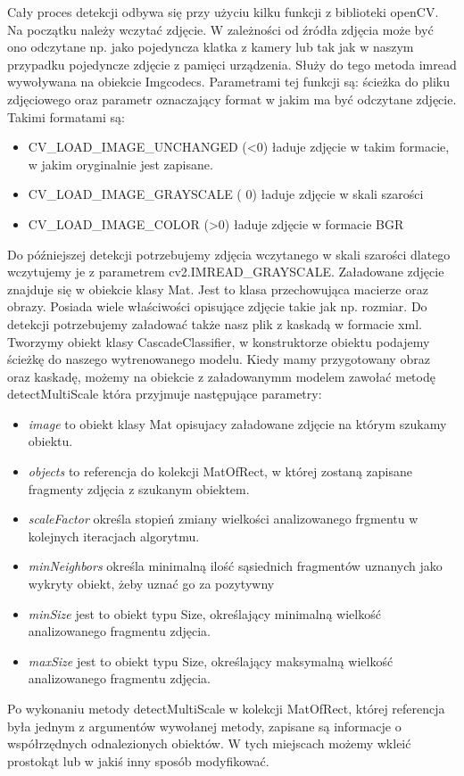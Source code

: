 Cały proces detekcji odbywa się przy użyciu kilku funkcji z biblioteki openCV. Na początku należy wczytać zdjęcie. W zależności od źródła zdjęcia może być ono odczytane np. jako pojedyncza klatka z kamery lub tak jak w naszym przypadku pojedyncze zdjęcie z pamięci urządzenia. Służy do tego metoda imread wywoływana na obiekcie Imgcodecs. Parametrami tej funkcji są: ścieżka do pliku zdjęciowego oraz parametr oznaczający format w jakim ma być odczytane zdjęcie. Takimi formatami są:
\begin{itemize}
    \item CV\_LOAD\_IMAGE\_UNCHANGED (\textless0) ładuje zdjęcie w takim formacie, w jakim oryginalnie jest zapisane.
    \item CV\_LOAD\_IMAGE\_GRAYSCALE ( 0) ładuje zdjęcie w skali szarości
    \item CV\_LOAD\_IMAGE\_COLOR (\textgreater0) ładuje zdjęcie w formacie BGR
\end{itemize}
Do późniejszej detekcji potrzebujemy zdjęcia wczytanego w skali szarości dlatego wczytujemy je z parametrem cv2.IMREAD\_GRAYSCALE.
Załadowane zdjęcie znajduje się w obiekcie klasy Mat. Jest to klasa przechowująca macierze oraz obrazy. Posiada wiele właściwości opisujące zdjęcie takie jak np. rozmiar.
Do detekcji potrzebujemy załadować także nasz plik z kaskadą w formacie xml. Tworzymy obiekt klasy CascadeClassifier, w konstruktorze obiektu podajemy ścieżkę do naszego wytrenowanego modelu. Kiedy mamy przygotowany obraz oraz kaskadę, możemy na obiekcie z załadowanymm modelem zawołać metodę detectMultiScale która przyjmuje następujące parametry:
\begin{itemize}
	\item \textit{image} to obiekt klasy Mat opisujacy załadowane zdjęcie na którym szukamy obiektu.
	\item \textit{objects} to referencja do kolekcji MatOfRect, w której zostaną zapisane fragmenty zdjęcia z szukanym obiektem.
	\item \textit{scaleFactor} określa stopień zmiany wielkości analizowanego frgmentu w kolejnych iteracjach algorytmu.
	\item \textit{minNeighbors} określa minimalną ilość sąsiednich fragmentów uznanych jako wykryty obiekt, żeby uznać go za pozytywny
	\item \textit{minSize} jest to obiekt typu Size, określający minimalną wielkość analizowanego fragmentu zdjęcia.
	\item \textit{maxSize} jest to obiekt typu Size, określający maksymalną wielkość analizowanego fragmentu zdjęcia.
\end{itemize}
Po wykonaniu metody detectMultiScale w kolekcji MatOfRect, której referencja była jednym z argumentów wywołanej metody, zapisane są informacje o współrzędnych odnalezionych obiektów. W tych miejscach możemy wkleić prostokąt lub w jakiś inny sposób modyfikować.
